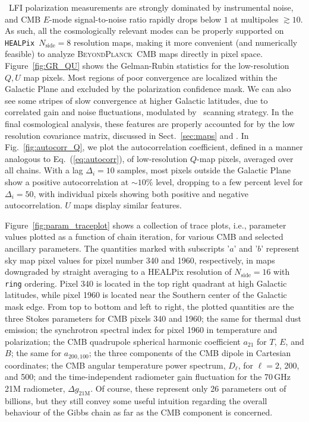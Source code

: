 \documentclass[twocolumn]{aa}
\def\healpix{\texttt{HEALPix}}
\newcommand{\BP}{\textsc{BeyondPlanck}}
\begin{document}
{\Planck\ LFI  polarization measurements are strongly dominated by instrumental noise, and CMB $E$-mode signal-to-noise ratio rapidly drops below $1$ at multipoles $\gtrsim 10$. As such, all the cosmologically relevant modes can be properly supported on \healpix\ $N_\mathrm{side} = 8$ resolution maps, making it more convenient (and numerically feasible) to analyze \BP\ CMB maps directly in pixel space. Figure~\ref{fig:GR_QU} shows the Gelman-Rubin statistics for the low-resolution $Q, U$ map pixels. Most regions of poor convergence are localized within the Galactic Plane and excluded by the polarization confidence mask. We can also see some stripes of slow convergence at higher Galactic latitudes, due to correlated gain and noise fluctuations, modulated by \Planck\ scanning strategy. In the final cosmological analysis, these features are properly accounted for by the low resolution covariance matrix, discussed in Sect.~\ref{sec:maps} and \cite{bp12}. In Fig.~\ref{fig:autocorr_Q}, we plot the autocorrelation coefficient, defined in a manner analogous to Eq.~(\ref{eq:autocorr}), of low-resolution $Q$-map pixels, averaged over all chains. With a lag $\Delta_i = 10$ samples, most pixels outside the Galactic Plane show a positive autocorrelation at $\sim 10\%$ level, dropping to a few percent level for $\Delta_i = 50$, with individual pixels showing both positive and negative autocorrelation. $U$ maps display similar features.}

Figure~\ref{fig:param_traceplot} shows a collection of trace plots,
i.e., parameter values plotted as a function of chain iteration, for
various CMB and selected ancillary parameters. The quantities marked
with subscripts '$a$' and '$b$' represent sky map pixel values for 
pixel number 340 and 1960, respectively, in maps downgraded by straight averaging to a HEALPix resolution of $N_{\mathrm{side}}=16$ with \texttt{ring}
ordering. Pixel 340 is located in the top right quadrant at high
Galactic latitudes, while pixel 1960 is located near the Southern
center of the Galactic mask edge. From top to
bottom and left to right, the plotted quantities are the three Stokes parameters for CMB
pixels 340 and 1960; the same for thermal dust emission; the
synchrotron spectral index for pixel 1960 in temperature and
polarization; the CMB quadrupole spherical harmonic coefficient
$a_{21}$ for $T$, $E$, and $B$; the same for $a_{200,100}$; the three
components of the CMB dipole in Cartesian coordinates; the CMB angular
temperature power spectrum, $D_{\ell}$, for $\ell=2$, 200, and 500;
and the time-independent radiometer gain fluctuation for the 70\,GHz
21M radiometer, $\Delta g_{21\mathrm{M}}$. Of course, these represent
only 26 parameters out of billions, but they still convey some useful
intuition regarding the overall behaviour of the Gibbs chain as far as
the CMB component is concerned.
\end{document}
